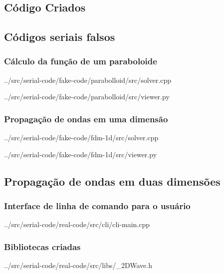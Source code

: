 \begin{appendices}
\chapter{Código Criados}
\section{Códigos seriais falsos}
	\subsection{Cálculo da função de um paraboloide}
	
	{../src/serial-code/fake-code/parabolloid/src/solver.cpp}
	
	
	{../src/serial-code/fake-code/parabolloid/src/viewer.py}
	
	\subsection{Propagação de ondas em uma dimensão}
	
	{../src/serial-code/fake-code/fdm-1d/src/solver.cpp}
	
	
	{../src/serial-code/fake-code/fdm-1d/src/viewer.py}

\section{Propagação de ondas em duas dimensões}
	\subsection{Interface de linha de comando para o usuário}
	
	{../src/serial-code/real-code/src/cli/cli-main.cpp}

	\subsection{Bibliotecas criadas}
	
	{../src/serial-code/real-code/src/libs/_2DWave.h}
	

\end{appendices}
